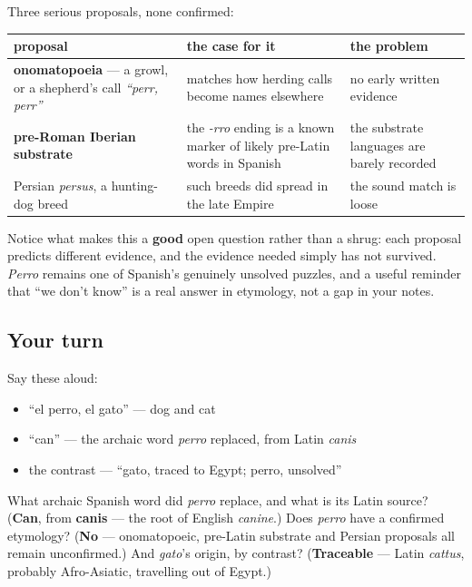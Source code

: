 \begin{culture}
Three serious proposals, none confirmed:

\noindent
\begin{tabularx}{\linewidth}{@{}>{\raggedright\arraybackslash}X>{\raggedright\arraybackslash}X>{\raggedright\arraybackslash}X@{}}
\toprule
\textbf{proposal} & \textbf{the case for it} & \textbf{the problem} \\
\midrule
\textbf{onomatopoeia} — a growl, or a shepherd's call \emph{\textquotedblleft{}perr, perr\textquotedblright{}} & matches how herding calls become names elsewhere & no early written evidence \\
\textbf{pre-Roman Iberian substrate} & the \emph{-rro} ending is a known marker of likely pre-Latin words in Spanish & the substrate languages are barely recorded \\
Persian \emph{persus}, a hunting-dog breed & such breeds did spread in the late Empire & the sound match is loose \\
\bottomrule
\end{tabularx}

Notice what makes this a \textbf{good} open question rather than a shrug: each proposal predicts different evidence, and the evidence needed simply has not survived. \emph{Perro} remains one of Spanish's genuinely unsolved puzzles, and a useful reminder that \textquotedblleft{}we don't know\textquotedblright{} is a real answer in etymology, not a gap in your notes.
\end{culture}

\subsection*{Your turn}
Say these aloud:

\begin{itemize}
\raggedright
  \item \textquotedblleft{}el perro, el gato\textquotedblright{} — dog and cat
  \item \textquotedblleft{}can\textquotedblright{} — the archaic word \emph{perro} replaced, from Latin \emph{canis}
  \item the contrast — \textquotedblleft{}gato, traced to Egypt; perro, unsolved\textquotedblright{}
\end{itemize}

\begin{tcolorbox}[breakable,colback=teal!4,colframe=teal!35!black,title={Before you move on}]
What archaic Spanish word did \emph{perro} replace, and what is its Latin source? (\textbf{Can}, from \textbf{canis} — the root of English \emph{canine}.) Does \emph{perro} have a confirmed etymology? (\textbf{No} — onomatopoeic, pre-Latin substrate and Persian proposals all remain unconfirmed.) And \emph{gato}'s origin, by contrast? (\textbf{Traceable} — Latin \emph{cattus}, probably Afro-Asiatic, travelling out of Egypt.)
\end{tcolorbox}
